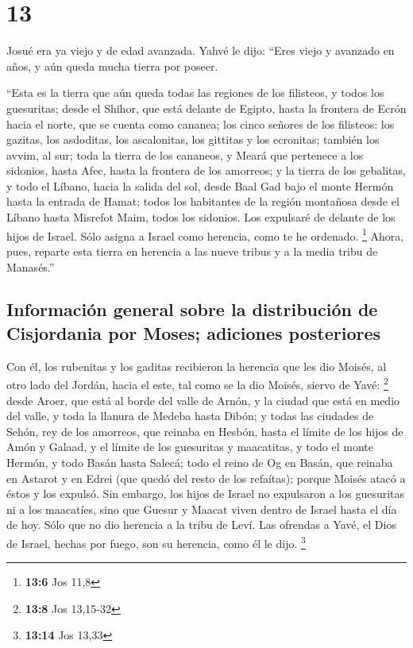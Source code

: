 \hypertarget{section-12}{%
\section{13}\label{section-12}}

 Josué era ya viejo y de edad avanzada. Yahvé le dijo:
``Eres viejo y avanzado en años, y aún queda mucha tierra por poseer.

 ``Esta es la tierra que aún queda todas las regiones de
los filisteos, y todos los guesuritas;  desde el Shihor,
que está delante de Egipto, hasta la frontera de Ecrón hacia el norte,
que se cuenta como cananea; los cinco señores de los filisteos: los
gazitas, los asdoditas, los ascalonitas, los gittitas y los ecronitas;
también los avvim,  al sur; toda la tierra de los
cananeos, y Meará que pertenece a los sidonios, hasta Afec, hasta la
frontera de los amorreos;  y la tierra de los gebalitas, y
todo el Líbano, hacia la salida del sol, desde Baal Gad bajo el monte
Hermón hasta la entrada de Hamat;  todos los habitantes de
la región montañosa desde el Líbano hasta Misrefot Maim, todos los
sidonios. Los expulsaré de delante de los hijos de Israel. Sólo asigna a
Israel como herencia, como te he ordenado. \footnote{\textbf{13:6} Jos
  11,8}  Ahora, pues, reparte esta tierra en herencia a
las nueve tribus y a la media tribu de Manasés.''

\hypertarget{informaciuxf3n-general-sobre-la-distribuciuxf3n-de-cisjordania-por-moses-adiciones-posteriores}{%
\subsection{Información general sobre la distribución de Cisjordania por
Moses; adiciones
posteriores}\label{informaciuxf3n-general-sobre-la-distribuciuxf3n-de-cisjordania-por-moses-adiciones-posteriores}}

 Con él, los rubenitas y los gaditas recibieron la
herencia que les dio Moisés, al otro lado del Jordán, hacia el este, tal
como se la dio Moisés, siervo de Yavé: \footnote{\textbf{13:8} Jos
  13,15-32}  desde Aroer, que está al borde del valle de
Arnón, y la ciudad que está en medio del valle, y toda la llanura de
Medeba hasta Dibón;  y todas las ciudades de Sehón, rey
de los amorreos, que reinaba en Hesbón, hasta el límite de los hijos de
Amón  y Galaad, y el límite de los guesuritas y
maacatitas, y todo el monte Hermón, y todo Basán hasta Salecá;
 todo el reino de Og en Basán, que reinaba en Astarot y
en Edrei (que quedó del resto de los refaítas); porque Moisés atacó a
éstos y los expulsó.  Sin embargo, los hijos de Israel no
expulsaron a los guesuritas ni a los maacatíes, sino que Guesur y Maacat
viven dentro de Israel hasta el día de hoy.  Sólo que no
dio herencia a la tribu de Leví. Las ofrendas a Yavé, el Dios de Israel,
hechas por fuego, son su herencia, como él le dijo. \footnote{\textbf{13:14}
  Jos 13,33}

